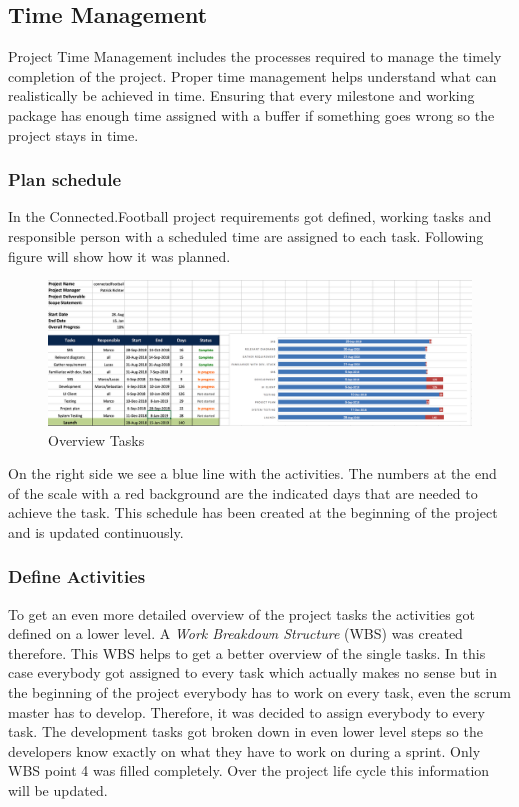\subsection{Time Management}
\label{ssec:time_management}

Project Time Management includes the processes required to manage the timely completion of the project. Proper time management helps understand what can realistically be achieved in time. Ensuring that every milestone and working package has enough time assigned with a buffer if something goes wrong so the project stays in time.

\subsubsection{Plan schedule}
\label{sssec:plan_schedule}

In the Connected.Football project requirements got defined, working tasks and responsible person with a scheduled time are assigned to each task. Following figure will show how it was planned.

\begin{figure}[H]
  \includegraphics[width=\linewidth]{images/diagrams/timemangement.png}
  \caption{Overview Tasks}
\end{figure}

On the right side we see a blue line with the activities. The numbers at the end of the scale with a red background are the indicated days that are needed to achieve the task. This schedule has been created at the beginning of the project and is updated continuously. 

\subsubsection{Define Activities}
\label{ssec:define_activities}

To get an even more detailed overview of the project tasks the activities got defined on a lower level. A \textit{Work Breakdown Structure} (WBS) was created therefore. This WBS helps to get a better overview of the single tasks. In this case everybody got assigned to every task which actually makes no sense but in the beginning of the project everybody has to work on every task, even the scrum master has to develop. Therefore, it was decided to assign everybody to every task. The development tasks got broken down in even lower level steps so the developers know exactly on what they have to work on during a sprint. Only WBS point 4 was filled completely. Over the project life cycle this information will be updated.

